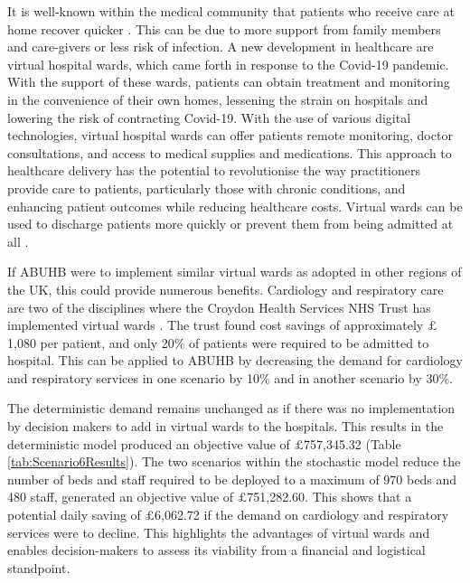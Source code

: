 \documentclass[../thesis.tex]{subfiles}
\begin{document}
It is well-known within the medical community that patients who receive care at home recover quicker \cite{CHNFT2022}. This can be due to more support from family members and care-givers or less risk of infection. A new development in healthcare are virtual hospital wards, which came forth in response to the Covid-19 pandemic. With the support of these wards, patients can obtain treatment and monitoring in the convenience of their own homes, lessening the strain on hospitals and lowering the risk of contracting Covid-19. With the use of various digital technologies, virtual hospital wards can offer patients remote monitoring, doctor consultations, and access to medical supplies and medications. This approach to healthcare delivery has the potential to revolutionise the way practitioners provide care to patients, particularly those with chronic conditions, and enhancing patient outcomes while reducing healthcare costs. Virtual wards can be used to discharge patients more quickly or prevent them from being admitted at all \cite{Trueland2023}.

If ABUHB were to implement similar virtual wards as adopted in other regions of the UK, this could provide numerous benefits. Cardiology and respiratory care are two of the disciplines where the Croydon Health Services NHS Trust has implemented virtual wards \cite{HINSL2021}. The trust found cost savings of approximately $\pounds$1,080 per patient, and only 20\% of patients were required to be admitted to hospital. This can be applied to ABUHB by decreasing the demand for cardiology and respiratory services in one scenario by 10\% and in another scenario by 30\%.%

The deterministic demand remains unchanged as if there was no implementation by decision makers to add in virtual wards to the hospitals. This results in the deterministic model produced an objective value of $\pounds$757,345.32 (Table \ref{tab:Scenario6Results}). The two scenarios within the stochastic model reduce the number of beds and staff required to be deployed to a maximum of 970 beds and 480 staff, generated an objective value of $\pounds$751,282.60. This shows that a potential daily saving of $\pounds$6,062.72 if the demand on cardiology and respiratory services were to decline. This highlights the advantages of virtual wards and enables decision-makers to assess its viability from a financial and logistical standpoint.
\end{document}
